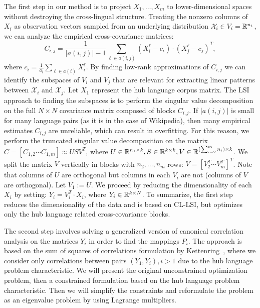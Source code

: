 The first step in our method is to project $X_1, \ldots, X_m$ to lower-dimensional spaces 
without destroying the cross-lingual structure. Treating the nonzero columns of $X_i$ as 
observation vectors sampled from an underlying distribution $\mathcal{X}_i \in V_i = \mathbb{R}^{n_i}$, 
we can analyze the empirical cross-covariance matrices: 
$$C_{i,j} = \frac{1}{|a(i,j)|-1 }\sum_{\ell \in a(i,j)} (X_i^{\ell} - c_i)\cdot (X_j^{\ell} - c_j)^T,$$
where $c_i = \frac{1}{a_i} \sum_{\ell \in a(i)}X_i^{\ell}$. By finding low-rank 
approximations of $C_{i,j}$ we can identify the subspaces of $V_i$ and $V_j$ that are 
relevant for extracting linear patterns between $\mathcal{X}_i$ and $\mathcal{X}_j$. 
Let $X_1$ represent the hub language corpus matrix. The LSI approach to finding the subspaces 
is to perform the singular value decomposition on the full $N \times N$ covariance matrix 
composed of blocks $C_{i,j}$. If $|a(i,j)|$ is small for many language pairs (as it is in the 
case of Wikipedia), then many empirical estimates $C_{i,j}$ are unreliable, which can result 
in overfitting. For this reason, we perform the truncated singular value decomposition on the 
matrix $C = [C_{1,2}  \cdots  C_{1,m}] \approx U S V^T$, where 
$U \in \mathbb{R}^{n_1 \times k}, S \in \mathbb{R}^{k \times k}, V \in \mathbb{R}^{(\sum_{i=2}^m n_i) \times k}$. 
We split the matrix $V$ vertically in blocks with 
$n_2, \ldots, n_m$ rows: $V = [V_2^T  \cdots  V_m^T]^T$. 
Note that columns of $U$ are orthogonal but columns in each $V_i$ are not (columns of $V$ 
are orthogonal). Let $V_1 := U$. We proceed by reducing the dimensionality of each $X_i$ by 
setting: $Y_i = V_i^T \cdot X_i$, where $Y_i \in \mathbb{R}^{k\times N}$. To summarize, the first step 
reduces the dimensionality of the data and is based on CL-LSI, but optimizes only the hub language 
related cross-covariance blocks.

The second step involves solving a generalized version of canonical correlation analysis on the 
matrices $Y_i$ in order to find the mappings $P_i$. The approach is based on the sum of 
squares of correlations formulation by Kettenring~\cite{Kettenring}, where we consider only 
correlations between pairs $(Y_1, Y_i), i >1$ due to the hub language problem characteristic.
We will present the original unconstrained optimization problem, then a constrained formulation 
based on the hub language problem characteristic. Then we will simplify the constraints and 
reformulate the problem as an eigenvalue problem by using Lagrange multipliers.

